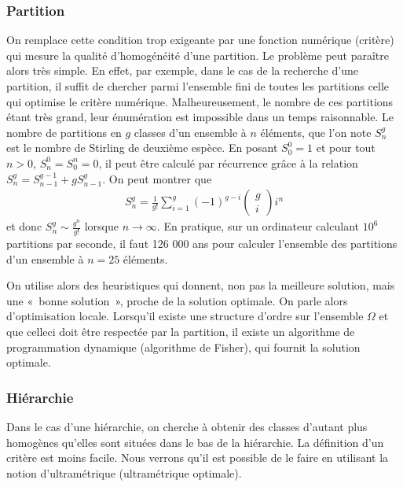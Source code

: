 \documentclass[letterpaper,10pt,french]{sphinxmanual}
\begin{document}
\subsubsection{Partition}
\label{\detokenize{clustering:id1}}
\sphinxAtStartPar
On remplace cette condition trop exigeante par une fonction numérique (critère) qui mesure la qualité d’homogénéité d’une partition. Le problème peut paraître alors très simple. En effet, par exemple, dans le cas de la recherche d’une partition, il suffit de chercher parmi l’ensemble fini de toutes les partitions celle qui optimise le critère numérique. Malheureusement, le nombre de ces partitions étant très grand, leur énumération est impossible dans un temps raisonnable.
Le nombre de partitions en \(g\) classes d’un ensemble à \(n\) éléments, que l’on note \(S_n^g\) est le nombre de Stirling de deuxième espèce. En posant \(S_0^0=1\) et pour tout \(n>0\), \(S_n^0=S_0^n=0\), il peut être calculé par récurrence grâce à la relation \(S_n^g=S_{n-1}^{g-1}+gS_{n-1}^g\). On peut montrer que
\begin{equation*}
\begin{split}S_n^g = \frac{1}{g!}\displaystyle\sum_{i=1}^g (-1)^{g-i}\begin{pmatrix}g\\ i \end{pmatrix}i^n\end{split}
\end{equation*}
\sphinxAtStartPar
et donc \(S_n^g\sim \frac{g^n}{g!}\) lorsque \(n\rightarrow\infty\). En pratique, sur un ordinateur calculant \(10^6\) partitions par seconde, il faut 126 000 ans pour calculer l’ensemble des partitions d’un ensemble à \(n=25\) éléments.

\sphinxAtStartPar
On utilise alors des heuristiques qui donnent, non pas la meilleure solution, mais une « bonne solution », proche de la solution optimale. On parle alors d’optimisation locale. Lorsqu’il existe une structure d’ordre sur l’ensemble  \(\Omega\) et que celle\sphinxhyphen{}ci doit être respectée par la partition, il existe un algorithme de programmation dynamique (algorithme de Fisher), qui fournit la solution optimale.


\subsubsection{Hiérarchie}
\label{\detokenize{clustering:hierarchie}}
\sphinxAtStartPar
Dans le cas d’une hiérarchie, on cherche à obtenir des classes d’autant plus homogènes qu’elles sont situées dans le bas de la hiérarchie. La définition d’un critère est moins facile. Nous verrons qu’il est possible de le faire en utilisant la
notion d’ultramétrique (ultramétrique optimale).
\end{document}
